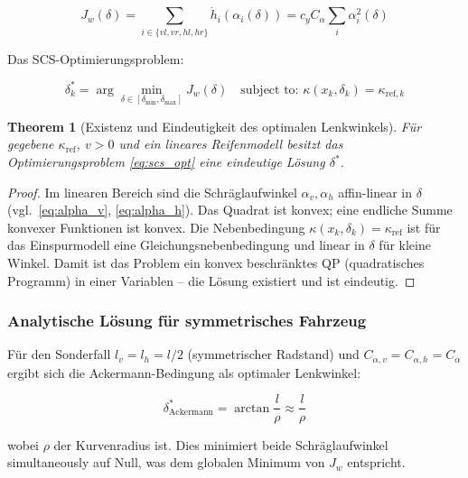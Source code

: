 ﻿\documentclass[12pt,a4paper]{article}
\newtheorem{theorem}{Theorem}[section]
\theoremstyle{definition}
\theoremstyle{remark}
\begin{document}
\begin{equation}
  J_w(\delta) = \sum_{i \in \{vl, vr, hl, hr\}} \dot{h}_i(\alpha_i(\delta))
  = c_y C_\alpha \sum_{i} \alpha_i^2(\delta)
  \label{eq:wear_total}
\end{equation}

Das SCS-Optimierungsproblem:

\begin{equation}
  \delta^*_k = \arg\min_{\delta \in [\delta_{\min}, \delta_{\max}]}
    J_w(\delta) \quad \text{subject to: } \kappa(x_k, \delta_k) = \kappa_{\mathrm{ref},k}
  \label{eq:scs_opt}
\end{equation}

\begin{theorem}[Existenz und Eindeutigkeit des optimalen Lenkwinkels]
\label{thm:scs_unique}
Für gegebene $\kappa_{\mathrm{ref}}$, $v > 0$ und ein lineares Reifenmodell besitzt
das Optimierungsproblem \eqref{eq:scs_opt} eine eindeutige Lösung $\delta^*$.
\end{theorem}

\begin{proof}
Im linearen Bereich sind die Schräglaufwinkel $\alpha_v, \alpha_h$ affin-linear
in $\delta$ (vgl.\ \eqref{eq:alpha_v}, \eqref{eq:alpha_h}). Das Quadrat ist konvex;
eine endliche Summe konvexer Funktionen ist konvex. Die Nebenbedingung
$\kappa(x_k, \delta_k) = \kappa_{\mathrm{ref}}$ ist für das Einspurmodell eine
Gleichungsnebenbedingung und linear in $\delta$ für kleine Winkel. Damit ist
das Problem ein konvex beschränktes QP (quadratisches Programm) in einer
Variablen -- die Lösung existiert und ist eindeutig.
\end{proof}

\subsubsection{Analytische Lösung für symmetrisches Fahrzeug}

Für den Sonderfall $l_v = l_h = l/2$ (symmetrischer Radstand) und
$C_{\alpha,v} = C_{\alpha,h} = C_\alpha$ ergibt sich die Ackermann-Bedingung
als optimaler Lenkwinkel:

\begin{equation}
  \delta^*_{\mathrm{Ackermann}} = \arctan\!\frac{l}{\rho}
  \approx \frac{l}{\rho}
  \label{eq:ackermann}
\end{equation}

wobei $\rho$ der Kurvenradius ist. Dies minimiert beide Schräglaufwinkel
simultaneously auf Null, was dem globalen Minimum von $J_w$ entspricht.
\end{document}
